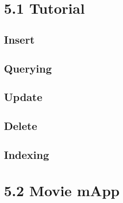 \documentclass[ngerman]{dis-template-add}
\begin{document}
\section*{5.1 Tutorial}

\subsection*{Insert}


\subsection*{Querying}

\subsection*{Update}

\subsection*{Delete}

\subsection*{Indexing}


\section*{5.2 Movie mApp}
\end{document}
